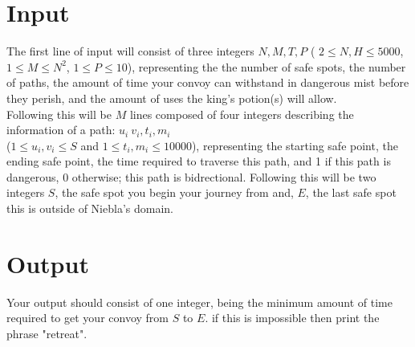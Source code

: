 \section*{Input}

\noindent The first line of input will consist of three integers $N, M, T, P$
( $2 \leq N, H \leq 5000$, $ 1 \leq M \leq N^2$, $1 \leq P \leq 10$), representing the the number of safe spots, the
number of paths, the amount of time your convoy can withstand in dangerous mist before they perish, and the amount of
uses the king's potion(s) will allow. \\

\noindent Following this will be $M$ lines composed of four integers describing the information of a path:
$u_i~ v_i, t_i, m_i$ \\ ($1 \leq u_i,v_i \leq S$ and $1 \leq t_i, m_i \leq 10000$), representing the starting safe point,
the ending safe point, the time required to traverse this path, and 1 if this path is dangerous, 0 otherwise; this path
is bidrectional. Following this will be two integers $S$, the safe spot you begin your journey
from and, $E$, the last safe spot this is outside of Niebla's domain. \\

\section*{Output}

Your output should consist of one integer, being the minimum amount of time required to get your convoy from $S$ to
$E$. if this is impossible then print the phrase "retreat".
